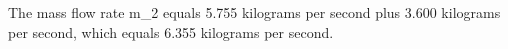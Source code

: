 The mass flow rate m_2 equals 5.755 kilograms per second plus 3.600 kilograms per second, which equals 6.355 kilograms per second.